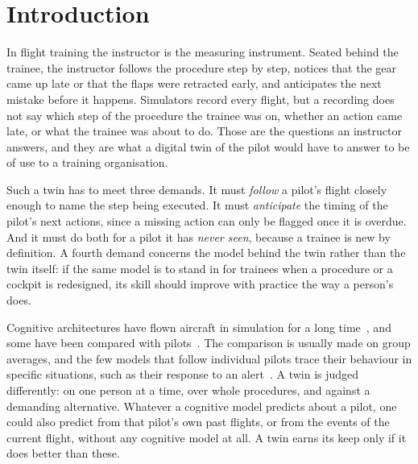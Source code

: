 \documentclass{llncs}
\begin{document}
\section{Introduction}

In flight training the instructor is the measuring instrument. Seated behind the trainee, the instructor follows the procedure step by
step, notices that the gear came up late or that the flaps were retracted early, and anticipates the next mistake before it happens.
Simulators record every flight, but a recording does not say which step of the procedure the trainee was on, whether an action came
late, or what the trainee was about to do. Those are the questions an instructor answers, and they are what a digital twin of the pilot
would have to answer to be of use to a training organisation.

Such a twin has to meet three demands. It must \emph{follow} a pilot's flight closely enough to name the step being executed. It must
\emph{anticipate} the timing of the pilot's next actions, since a missing action can only be flagged once it is overdue. And it must do
both for a pilot it has \emph{never seen}, because a trainee is new by definition. A fourth demand concerns the model behind the twin
rather than the twin itself: if the same model is to stand in for trainees when a procedure or a cockpit is redesigned, its skill should
improve with practice the way a person's does.

Cognitive architectures have flown aircraft in simulation for a long time~\cite{jones_tacair_1999,zemla_2011_actr_taxiing}, and some
have been compared with pilots~\cite{xu_computational_2024}. The comparison is usually made on group averages, and the few models that
follow individual pilots trace their behaviour in specific situations, such as their response to an alert~\cite{klaproth_neuroadaptive_2020,blum_anticipation_2022}.
A twin is judged differently: on one person at a time, over whole procedures, and against a demanding alternative. Whatever a cognitive model predicts about a pilot, one could also predict from that pilot's own past flights, or
from the events of the current flight, without any cognitive model at all. A twin earns its keep only if it does better than these.
\end{document}
